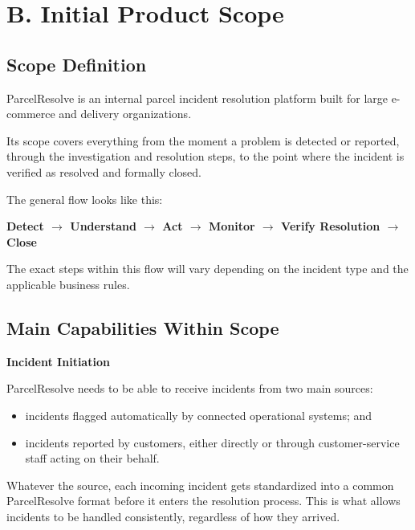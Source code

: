\documentclass[11pt,a4paper]{article}
\begin{document}

\section{B. Initial Product Scope}

\subsection{Scope Definition}

ParcelResolve is an internal parcel incident resolution platform
built for large e-commerce and delivery organizations.

Its scope covers everything from the moment a problem is detected or
reported, through the investigation and resolution steps, to the point
where the incident is verified as resolved and formally closed.

The general flow looks like this:

\begin{center}
\textbf{
Detect
$\rightarrow$
Understand
$\rightarrow$
Act
$\rightarrow$
Monitor
$\rightarrow$
Verify Resolution
$\rightarrow$
Close
}
\end{center}

The exact steps within this flow will vary depending on the incident
type and the applicable business rules.


\subsection{Main Capabilities Within Scope}

\textbf{Incident Initiation}

ParcelResolve needs to be able to receive incidents from two main
sources:

\begin{itemize}
    \item incidents flagged automatically by connected operational
    systems; and
    \item incidents reported by customers, either directly or through
    customer-service staff acting on their behalf.
\end{itemize}

Whatever the source, each incoming incident gets standardized into a
common ParcelResolve format before it enters the resolution process.
This is what allows incidents to be handled consistently, regardless
of how they arrived.
\end{document}

